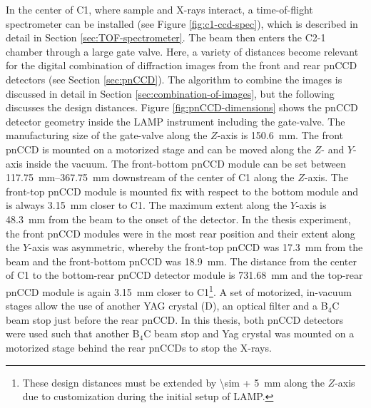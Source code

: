 %
In the center of C1, where sample and X-rays interact, a time-of-flight spectrometer can be installed (see Figure \ref{fig:c1-ccd-spec}), which is described in detail in Section \ref{sec:TOF-spectrometer}. The beam then enters the C2-1 chamber through a large gate valve. Here, a variety of distances become relevant for the digital combination of diffraction images from the front and rear pnCCD detectors (see Section \ref{sec:pnCCD}). The algorithm to combine the images is discussed in detail in Section \ref{sec:combination-of-images}, but the following discusses the design distances. Figure \ref{fig:pnCCD-dimensions} shows the pnCCD detector geometry inside the LAMP instrument including the gate-valve. The manufacturing size of the gate-valve along the $Z$-axis is \SI{150.6}{\milli\meter}. The front pnCCD is mounted on a motorized stage and can be moved along the $Z$- and $Y$-axis inside the vacuum. The front-bottom pnCCD module can be set between \SIrange{117.75}{367.75}{\milli\meter} downstream of the center of C1 along the $Z$-axis. The front-top pnCCD module is mounted fix with respect to the bottom module and is always \SI{3.15}{\milli\meter} closer to C1. The maximum extent along the $Y$-axis is \SI{48.3}{\milli\meter} from the beam to the onset of the detector. In the thesis experiment, the front pnCCD modules were in the most rear position and their extent along the $Y$-axis was asymmetric, whereby the front-top pnCCD was \SI{17.3}{\milli\meter} from the beam and the front-bottom pnCCD was \SI{18.9}{\milli\meter}. The distance from the center of C1 to the bottom-rear pnCCD detector module is \SI{731.68}{\milli\meter} and the top-rear pnCCD module is again \SI{3.15}{\milli\meter} closer to C1\footnote{These design distances must be extended by \SI{\sim + 5}{\milli\meter} along the $Z$-axis due to customization during the initial setup of LAMP.}. A set of motorized, in-vacuum stages allow the use of another YAG crystal (D), an optical filter and a B$_{4}$C beam stop just before the rear pnCCD. In this thesis, both pnCCD detectors were used such that another B$_{4}$C beam stop and Yag crystal was mounted on a motorized stage behind the rear pnCCDs to stop the X-rays.
%
%
%

